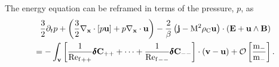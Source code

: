     The energy equation can be reframed in terms of the pressure, $p$, as
    \begin{multline}
        \frac{3}{2}\partial_{t}p + \left(\frac{3}{2}\nabla_{\mathbf{x}}\cdot[p\mathbf{u}] + p\nabla_{\mathbf{x}}\cdot\mathbf{u}\right) - \frac{2}{\beta}\left(\mathbf{j} - \mathrm{M}^{2}\rho_{\mathrm{C}}\mathbf{u}\right)\cdot(\mathbf{E} + \mathbf{u}\wedge\mathbf{B})  \\
        =  - \int_{\mathbf{v}}\left[\frac{1}{{\mathrm{Re}_{\mathrm{f}}}_{++}}\pmb{\mathsf{\delta}}\mathbf{C}_{++} + \cdots + \frac{1}{{\mathrm{Re}_{\mathrm{f}}}_{--}}\pmb{\mathsf{\delta}}\mathbf{C}_{--}\right]\cdot(\mathbf{v} - \mathbf{u}) + \mathcal{O}\left[\frac{\mathrm{m}_{-}}{\mathrm{m}_{-}}\right].  \label{eqn:energy conservation introduction}
    \end{multline}
    